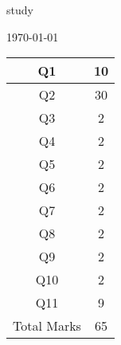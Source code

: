 \documentclass[10pt]{article}
\begin{document}
\sloppy
\vspace*{2cm}
\begin{center}
\huge{study}\\
\vspace*{2cm}
\date[\today\\
\vspace*{2 cm}
\begin{tabular}{|c|c|}
\hline Q1 & 10 \\ \hline Q2 & 30 \\ \hline Q3 & 2 \\ \hline Q4 & 2 \\ \hline Q5 & 2 \\ \hline Q6 & 2 \\ \hline Q7 & 2 \\ \hline Q8 & 2 \\ \hline Q9 & 2 \\ \hline Q10 & 2 \\ \hline Q11 & 9 \\ \hline Total Marks & 65\\
\hline \end{tabular}\end{center}
\end{document}
